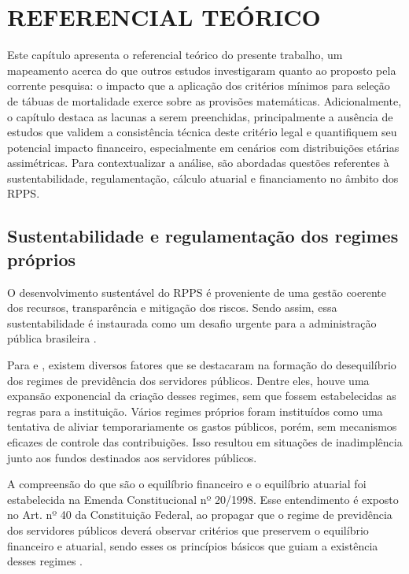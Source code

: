 \chapter{\textbf{REFERENCIAL TEÓRICO}}
Este capítulo apresenta o referencial teórico do presente trabalho, um mapeamento acerca do que outros estudos investigaram quanto ao proposto pela corrente pesquisa: o impacto que a aplicação dos critérios mínimos para seleção de tábuas de mortalidade exerce sobre as provisões matemáticas. Adicionalmente, o capítulo destaca as lacunas a serem preenchidas, principalmente a ausência de estudos que validem a consistência técnica deste critério legal e quantifiquem seu potencial impacto financeiro, especialmente em cenários com distribuições etárias assimétricas. Para contextualizar a análise, são abordadas questões referentes à sustentabilidade, regulamentação, cálculo atuarial e financiamento no âmbito dos RPPS.

\section{\textbf{Sustentabilidade e regulamentação dos regimes próprios}}
O desenvolvimento sustentável do RPPS é proveniente de uma gestão coerente dos recursos, transparência e mitigação dos riscos. Sendo assim, essa sustentabilidade é instaurada como um desafio urgente para a administração pública brasileira \cite{puchalski2022}.

Para  e , existem diversos fatores que se destacaram na formação do desequilíbrio dos regimes de previdência dos servidores públicos. Dentre eles, houve uma expansão exponencial da criação desses regimes, sem que fossem estabelecidas as regras para a instituição. Vários regimes próprios foram instituídos como uma tentativa de aliviar temporariamente os gastos públicos, porém, sem mecanismos eficazes de controle das contribuições. Isso resultou em situações de inadimplência junto aos fundos destinados aos servidores públicos.

A compreensão do que são o equilíbrio financeiro e o equilíbrio atuarial foi estabelecida na Emenda Constitucional nº 20/1998. Esse entendimento é exposto no Art. nº 40 da Constituição Federal, ao propagar que o regime de previdência dos servidores públicos deverá observar critérios que preservem o equilíbrio financeiro e atuarial, sendo esses os princípios básicos que guiam a existência desses regimes \cite{puchalski2022, nogueira2012equilibrio}.

